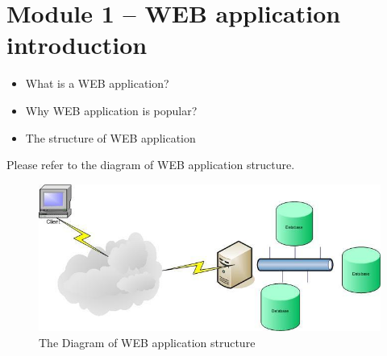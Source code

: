\section{Module 1 -- WEB application introduction}

\begin{itemize}
\item What is a WEB application?
\item Why WEB application is popular?
\item The structure of WEB application
\end{itemize}

Please refer to the diagram of WEB application structure.\\
\begin{figure}
 \centering
 \includegraphics[scale=0.8]{webapp_structure}
 \caption[Diagram of WEB application structure]{ 
 The Diagram of WEB application structure
 } \label{pic_webapp}
\end{figure}





